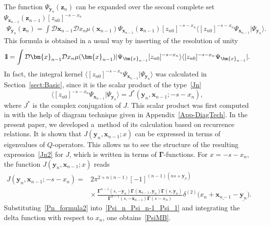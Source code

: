 \documentclass[pdftex]{sigma}
\newcommand{\II}{\hbox{{1}\kern-.25em\hbox{l}}}
\numberwithin{equation}{section}
\begin{document}
The function $\Psi_{\bm{y}_n}(\bm{z}_n)$ can be expanded over the second complete set $\Psi_{\bm{x}_{n-1}}(\bm{z}_{n-1}) [z_{n0}]^{-s-x_n}$
\begin{align} \label{Psi_n_Psi_n-1_Psi_1}
\Psi_{\bm{y}_n}(\bm{z}_n) =
\int \mathcal{D}\bm{x}_{n-1} \mathcal{D} x_n \mu(\bm{x}_{n-1})
\Psi_{\bm{x}_{n-1}}(\bm{z}_{n-1}) [z_{n0}]^{-s-x_n} \langle[z_{n0}]^{-s-x_n} \Psi_{\bm{x}_{n-1}}|\Psi_{\bm{y}_n}\rangle .
\end{align}
This formula is obtained in a usual way by inserting of the resolution of unity
\begin{align*}
\II = \int \mathcal{D}\bm{x}_{n-1} \mathcal{D} x_n \mu(\bm{x}_{n-1})
|\Psi_{\bm{x}_{n-1}} [z_{n0}]^{-s-x_n}\rangle \langle[z_{n0}]^{-s-x_n} \Psi_{\bm{x}_{n-1}}| .
\end{align*}
In fact, the integral kernel $\langle[z_{n0}]^{-s-x_n} \Psi_{\bm{x}_{n-1}}|\Psi_{\bm{y}_n}\rangle$ was calculated in Section~\ref{sect:Basic}, since it is the scalar product of the type~\eqref{Jn}
\begin{equation*}
	\langle[z_{n0}]^{-s-x_n} \Psi_{\bm{x}_{n-1}}|\Psi_{\bm{y}_n}\rangle = J^\ast(\bm{y}_n,\bm{x}_{n-1}; -s-x_n) ,
\end{equation*}
where $J^\ast$ is the complex conjugation of $J$. This scalar product was first computed in \cite{Val20} with the help of diagram technique given in Appendix~\ref{App-DiagTech}. In the present paper, we developed a~method of its calculation based on recurrence relations. It is shown that $J(\bm{y}_n,\bm{x}_{n-1}; x)$ can be expressed in terms of eigenvalues of $Q$-operators. This allows us to see the structure of the resulting expression~\eqref{Jn2} for $J$, which is written in terms of $\mathbf{\Gamma}$-functions.
For $x=-s-x_n$, the function $J(\bm{y}_n,\bm{x}_{n-1}; x)$ reads
\begin{align}
\nonumber
J(\bm{y}_n,\bm{x}_{n-1}; -s-x_n) ={}&
2\pi^{2+n(n-1)}[-1]^{(n-1)(ns+\underline{\bm{y}_n})} \\
& \label{Pn_formula2}
{\times}\,
\frac{\mathbf{\Gamma}^{n-1}(s ,-\bm{y}_n)
\mathbf{\Gamma}(\bm{x}_{n-1},\bm{y}_n)
\mathbf{\Gamma}(s ,\bm{y}_n)}
{\mathbf{\Gamma}^{n-1}(s ,-\bm{x}_{n-1}) \mathbf{\Gamma}(s-x_n)}
\delta^{(2)}\bigl(x_n+\underline{\bm{x}_{n-1}}-\underline{\bm{y}_n}\bigr) .
\end{align}
Substituting~\eqref{Pn_formula2} into~\eqref{Psi_n_Psi_n-1_Psi_1} and integrating the delta function with respect to $x_n$, one obtains~\eqref{PsiMB}.
\end{document}
